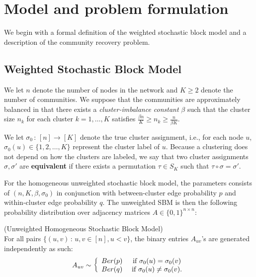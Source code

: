 \documentclass{article}
\begin{document}
\section{Model and problem formulation}
\label{sec:formulation}

We begin with a formal definition of the weighted stochastic block model and a description of the community recovery problem. 

\subsection{Weighted Stochastic Block Model}

We let $n$ denote the number of nodes in the network and $K \geq 2$ denote the number of communities. We suppose that the communities are approximately balanced in that there exists a \emph{cluster-imbalance constant} $\beta$ such that the cluster size $n_k$ for each cluster $k = 1, \dots, K$ satisfies $\frac{\beta n}{K} \geq n_k \geq \frac{n}{\beta K}$.

\begin{definition}
We let $\sigma_0 \,:\, [n] \rightarrow [K]$ denote the true cluster assignment, i.e., for each node $u$, $\sigma_0(u) \in \{1,2, \dots, K\}$ represent the cluster label of $u$. Because a clustering does not depend on how the clusters are labeled, we say that two cluster assignments $\sigma, \sigma'$ are \textbf{equivalent} if there exists a permutation $\tau \in S_K$ such that $\tau \circ \sigma = \sigma'$. \end{definition}


For the homogeneous unweighted stochastic block model, the parameters consists of $(n, K, \beta, \sigma_0)$ in conjunction with between-cluster edge probability $p$ and within-cluster edge probability $q$. The unweighted SBM is then the following probability distribution over adjacency matrices $A \in \{0,1\}^{n \times n}$:

\begin{definition} (Unweighted Homogeneous Stochastic Block Model)\\
For all pairs $\{ (u, v) \,:\, u,v \in [n], u < v \}$, the binary entries $A_{uv}$'s are generated independently as such: 
  \[
A_{uv} \sim \left\{ \begin{array}{cc}
 Ber(p) & \textrm{ if } \sigma_0(u) = \sigma_0(v) \\
 Ber(q) & \textrm{ if } \sigma_0(u) \neq \sigma_0(v). 
\end{array} \right.
\]
\end{definition}
\end{document}

